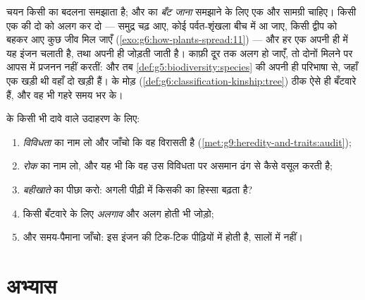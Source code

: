 \begin{proposition}[बदलाव से नई प्रजातियों तक]\label{prop:g9:how-species-change:speciation}
चयन किसी  का बदलना समझाता है; और  का \emph{बँट जाना} समझाने
के लिए एक और सामग्री चाहिए। किसी एक  की दो  को अलग कर दो
--- समुद्र चढ़ आए, कोई पर्वत-शृंखला बीच में आ जाए, किसी द्वीप को बहकर
आए कुछ जीव मिल जाएँ (\cref{exo:g6:how-plants-spread:11}) --- और हर एक
अपनी ही  में यह इंजन चलाती है, तथा अपनी ही  जोड़ती
जाती है। काफ़ी दूर तक अलग हो जाएँ, तो दोनों मिलने पर आपस में प्रजनन नहीं
करतीं: और तब \cref{def:g5:biodiversity:species} की अपनी ही परिभाषा से,
जहाँ एक  खड़ी थी वहाँ दो खड़ी हैं।  के मोड़
(\cref{def:g6:classification-kinship:tree}) ठीक ऐसे ही बँटवारे हैं, और
वह भी गहरे समय भर के।
\end{proposition}
\admitted

\begin{method}[किसी भी मामले पर यह इंजन चलाना]\label{met:g9:how-species-change:run}
 के किसी भी दावे वाले उदाहरण के लिए:
\begin{enumerate}
  \item \emph{विविधता} का नाम लो और जाँचो कि वह विरासती है
        (\cref{met:g9:heredity-and-traits:audit});
  \item \emph{रोक} का नाम लो, और यह भी कि वह उस विविधता पर असमान ढंग
        से कैसे वसूल करती है;
  \item \emph{बहीखाते} का पीछा करो: अगली पीढ़ी में किसकी  का
        हिस्सा बढ़ता है?
  \item किसी बँटवारे के लिए \emph{अलगाव} और अलग होती  भी
        जोड़ो;
  \item और समय-पैमाना जाँचो: इस इंजन की टिक-टिक पीढ़ियों में होती है,
        सालों में नहीं।
\end{enumerate}
\end{method}

\section{अभ्यास}

